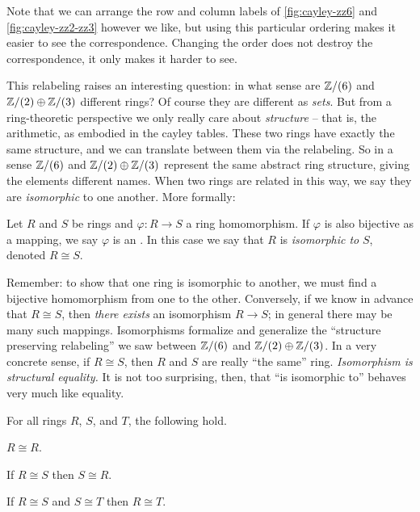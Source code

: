 Note that we can arrange the row and column labels of \autoref{fig:cayley-zz6} and \autoref{fig:cayley-zz2-zz3} however we like, but using this particular ordering makes it easier to see the correspondence. Changing the order does not destroy the correspondence, it only makes it harder to see.

This relabeling raises an interesting question: in what sense are \(\mathbb{Z}/(6)\) and \(\mathbb{Z}/(2) \oplus \mathbb{Z}/(3)\) different rings? Of course they are different as \emph{sets}. But from a ring-theoretic perspective we only really care about \emph{structure} -- that is, the arithmetic, as embodied in the cayley tables. These two rings have exactly the same structure, and we can translate between them via the relabeling. So in a sense \(\mathbb{Z}/(6)\) and \(\mathbb{Z}/(2) \oplus \mathbb{Z}/(3)\) represent the same abstract ring structure, giving the elements different names. When two rings are related in this way, we say they are \emph{isomorphic} to one another. More formally:

\begin{dfn} \label{dfn:isomorphism}
Let \(R\) and \(S\) be rings and \(\varphi : R \rightarrow S\) a ring homomorphism. If \(\varphi\) is also bijective as a mapping, we say \(\varphi\) is an . In this case we say that \(R\) is \emph{isomorphic to} \(S\), denoted \(R \cong S\).
\end{dfn}

Remember: to show that one ring is isomorphic to another, we must find a bijective homomorphism from one to the other. Conversely, if we know in advance that \(R \cong S\), then \emph{there exists} an isomorphism \(R \rightarrow S\); in general there may be many such mappings. Isomorphisms formalize and generalize the ``structure preserving relabeling'' we saw between \(\mathbb{Z}/(6)\) and \(\mathbb{Z}/(2) \oplus \mathbb{Z}/(3)\). In a very concrete sense, if \(R \cong S\), then \(R\) and \(S\) are really ``the same'' ring. \emph{Isomorphism is structural equality.} It is not too surprising, then, that ``is isomorphic to'' behaves very much like equality.

\begin{prop} \label{prop:iso-equiv}
For all rings \(R\), \(S\), and \(T\), the following hold.
\begin{proplist*}
\item \(R \cong R\). \label{prop:iso-equiv:refl}
\item If \(R \cong S\) then \(S \cong R\). \label{prop:iso-equiv:symm}
\item If \(R \cong S\) and \(S \cong T\) then \(R \cong T\). \label{prop:iso-equiv:trans}
\end{proplist*}
\end{prop}

